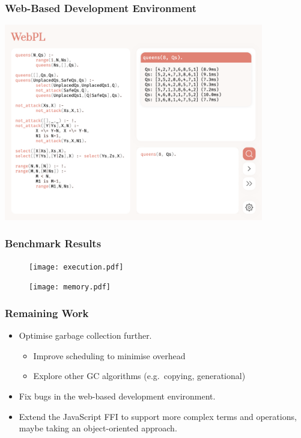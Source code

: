 \documentclass{beamer}
\begin{document}
\begin{frame}
\frametitle{Web-Based Development Environment}

\begin{center}
\includegraphics[width=0.85\textwidth]{browser.png}
\end{center}

\end{frame}

\begin{frame}
\frametitle{Benchmark Results}

\begin{figure}[h]
\centering
\begin{minipage}{0.45\textwidth}
  \centering
  \texttt{[image: execution.pdf]}
\end{minipage}
\hfill
\begin{minipage}{0.45\textwidth}
  \centering
  \texttt{[image: memory.pdf]}
\end{minipage}
\end{figure}

\end{frame}

\begin{frame}
\frametitle{Remaining Work}

\begin{itemize}
\item Optimise garbage collection further.
\begin{itemize}
\item Improve scheduling to minimise overhead
\item Explore other GC algorithms (e.g.\ copying, generational)
\end{itemize}
\item Fix bugs in the web-based development environment.
\item Extend the JavaScript FFI to support more complex terms and operations, maybe taking an object-oriented approach.
\end{itemize}


\end{frame}
\end{document}
